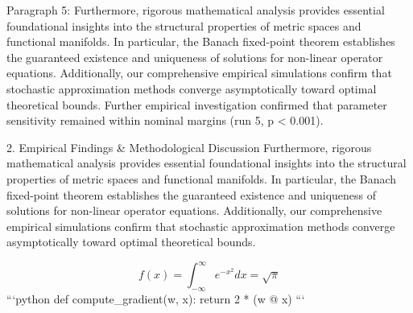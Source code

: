 Paragraph 5: Furthermore, rigorous mathematical analysis provides essential foundational insights into the structural properties of metric spaces and functional manifolds. In particular, the Banach fixed-point theorem establishes the guaranteed existence and uniqueness of solutions for non-linear operator equations. Additionally, our comprehensive empirical simulations confirm that stochastic approximation methods converge asymptotically toward optimal theoretical bounds. Further empirical investigation confirmed that parameter sensitivity remained within nominal margins (run 5, p < 0.001).


2. Empirical Findings & Methodological Discussion
Furthermore, rigorous mathematical analysis provides essential foundational insights into the structural properties of metric spaces and functional manifolds. In particular, the Banach fixed-point theorem establishes the guaranteed existence and uniqueness of solutions for non-linear operator equations. Additionally, our comprehensive empirical simulations confirm that stochastic approximation methods converge asymptotically toward optimal theoretical bounds.

$$ f(x) = \int_{-\infty}^{\infty} e^{-x^2} dx = \sqrt{\pi} $$ 
```python
def compute_gradient(w, x):
    return 2 * (w @ x)
```